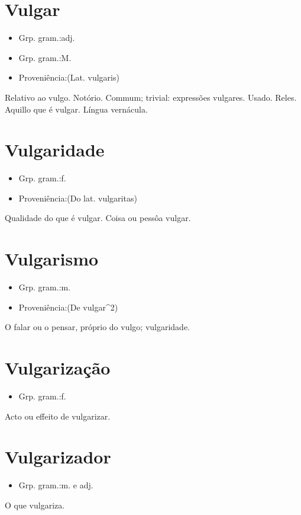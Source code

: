 \documentclass{article}
\begin{document}
\section{Vulgar}
\begin{itemize}
\item {Grp. gram.:adj.}
\end{itemize}
\begin{itemize}
\item {Grp. gram.:M.}
\end{itemize}
\begin{itemize}
\item {Proveniência:(Lat. \textunderscore vulgaris\textunderscore )}
\end{itemize}
Relativo ao vulgo.
Notório.
Commum; trivial: \textunderscore expressões vulgares\textunderscore .
Usado.
Reles.
Aquillo que é vulgar.
Língua vernácula.
\section{Vulgaridade}
\begin{itemize}
\item {Grp. gram.:f.}
\end{itemize}
\begin{itemize}
\item {Proveniência:(Do lat. \textunderscore vulgaritas\textunderscore )}
\end{itemize}
Qualidade do que é vulgar.
Coisa ou pessôa vulgar.
\section{Vulgarismo}
\begin{itemize}
\item {Grp. gram.:m.}
\end{itemize}
\begin{itemize}
\item {Proveniência:(De \textunderscore vulgar\textunderscore ^2)}
\end{itemize}
O falar ou o pensar, próprio do vulgo; vulgaridade.
\section{Vulgarização}
\begin{itemize}
\item {Grp. gram.:f.}
\end{itemize}
Acto ou effeito de vulgarizar.
\section{Vulgarizador}
\begin{itemize}
\item {Grp. gram.:m.  e  adj.}
\end{itemize}
O que vulgariza.
\end{document}
